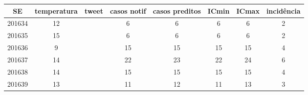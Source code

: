 \begin{tabular}{c|ccccccc}
  \hline
SE & temperatura & tweet & casos notif & casos preditos & ICmin & ICmax & incidência \\ 
  \hline
201634 & 12 &  & 6 & 6 & 6 & 6 & 2 \\ 
  201635 & 15 &  & 6 & 6 & 6 & 6 & 2 \\ 
  201636 & 9 &  & 15 & 15 & 15 & 15 & 4 \\ 
  201637 & 14 &  & 22 & 23 & 22 & 24 & 6 \\ 
  201638 & 14 &  & 15 & 15 & 15 & 15 & 4 \\ 
  201639 & 13 &  & 11 & 12 & 11 & 13 & 3 \\ 
   \hline
\end{tabular}

